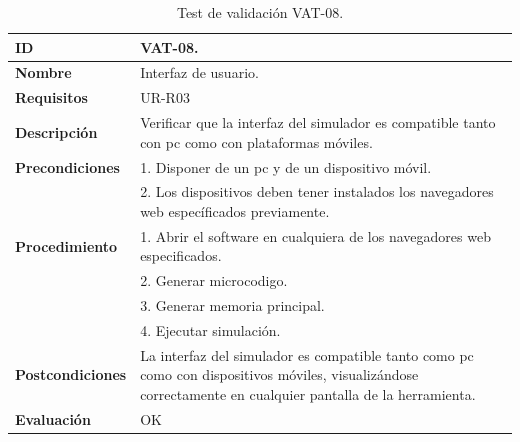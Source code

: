 \begin{center}
\begin{table}[htbp]
\centering
\caption{Test de validación VAT-08.}
\begin{tabular}{@{}p{2.5cm} p{13cm}@{}} 
\toprule
\textbf{ID} 					& VAT-08. \\
\midrule
\textbf{Nombre} 				& Interfaz de usuario. \\
\midrule
\textbf{Requisitos} 		& UR-R03\\
\midrule
\textbf{Descripción} 		& Verificar que la interfaz del simulador es compatible tanto con \acrshort{pc} como con plataformas móviles. \\
\midrule
\textbf{Precondiciones}		& 1. Disponer de un \acrshort{pc} y de un dispositivo móvil. \\
											& 2. Los dispositivos deben tener instalados los navegadores web específicados previamente. \\
\midrule
\textbf{Procedimiento}			& 1. Abrir el \gls{software} en cualquiera de los navegadores web especificados. \\
							& 2. Generar \gls{microcodigo}.\\
							& 3. Generar memoria principal.\\
							& 4. Ejecutar simulación.\\
\midrule
\textbf{Postcondiciones} 		&  La interfaz del simulador es compatible tanto como \acrshort{pc} como con dispositivos móviles, visualizándose correctamente en cualquier pantalla de la herramienta.\\
\midrule
\textbf{Evaluación} 			& OK \\
\bottomrule
\end{tabular}
\label{tab:vat-08}
\end{table}
\end{center}

